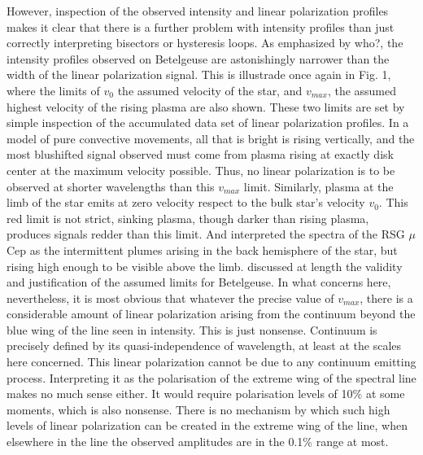 \documentclass{/Users/art2/TeX/aanda/aa}
\begin{document}
However, inspection of the observed intensity and linear polarization profiles makes it clear that there is a further problem with intensity profiles 
than just correctly interpreting bisectors or hysteresis loops. As emphasized by who?, the intensity profiles observed on Betelgeuse are astonishingly 
narrower than the width of the linear polarization signal. This is illustrade once again in Fig. 1, where the limits of $v_0$ the assumed velocity 
of the star, and $v_{max}$, the assumed highest velocity of the rising plasma are also shown. These two limits are set by simple inspection of the
accumulated data set of linear polarization profiles. In a model of pure convective movements, all that is bright is rising vertically, and the most 
blushifted signal observed must come from plasma rising at exactly disk center at the maximum velocity possible. Thus, no linear polarization is 
to be observed at shorter wavelengths than this $v_{max}$ limit. Similarly, plasma at the limb of the star emits at zero velocity respect to the 
bulk star's velocity $v_0$. This red limit is not strict, sinking plasma, though darker than rising plasma, produces signals redder than this limit. And 
\cite{} interpreted the spectra of the RSG $\mu $Cep as the intermittent plumes arising in the back hemisphere of the star, but rising high enough to 
be visible above the limb.  \cite{} discussed at length the validity and justification of the assumed limits for Betelgeuse.  In what concerns here, nevertheless, 
it is most obvious that whatever the precise value of $v_{max}$, there is a considerable amount of linear polarization arising from the continuum beyond the blue 
wing of the line seen in intensity. This is just nonsense. Continuum is precisely defined by its quasi-independence of wavelength, at least at the 
scales here concerned. This linear polarization cannot be due to any continuum emitting process. Interpreting it as the polarisation of the extreme 
wing of the spectral line makes no much sense either. It would require polarisation levels of 10\% at some moments, which is also nonsense. There is no 
mechanism by which such high levels of linear polarization can be created in the extreme wing of the line, when elsewhere in the line the observed amplitudes 
are in the 0.1\% range at most. 
\end{document}
